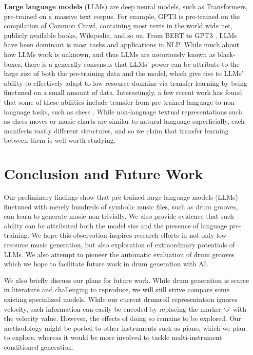 \documentclass[letterpaper]{article} %
\begin{document}
\textbf{Large language models} (LLMs) are deep neural models, such as Transformers, pre-trained on a massive text corpus. For example, GPT3 is pre-trained on the compilation of Common Crawl, containing most texts in the world wide net, publicly available books, Wikipedia, and so on. From BERT \cite{devlin-etal-2019-bert} to GPT3 \cite{NEURIPS2020_1457c0d6}, LLMs have been dominant is most tasks and applications in NLP. While much about how LLMs work is unknown, and thus LLMs are notoriously known as black-boxes, there is a generally consensus that LLMs' power can be attribute to the large size of both the pre-training data and the model, which give rise to LLMs' ability to effectively adapt to low-resource domains via transfer learning by being finetuned on a small amount of data. Interestingly, a few recent work has found that some of these abilities include transfer from pre-trained language to non-language tasks, such as chess \cite{stockl-2021-watching}. While non-language textual representations such as chess moves or music charts are similar to natural language superficially, each manifests vastly different structures, and so we claim that transfer learning between them is well worth studying.

\section{Conclusion and Future Work}
Our preliminary findings show that pre-trained large language models (LLMs) finetuned with merely hundreds of symbolic music files, such as drum grooves, can learn to generate music non-trivially. We also provide evidence that such ability can be attributed both the model size and the presence of language pre-training. We hope this observation inspires research efforts in not only low-resource music generation, but also exploration of extraordinary potentials of LLMs. We also attempt to pioneer the automatic evaluation of drum grooves which we hope to facilitate future work in drum generation with AI.

We also briefly discuss our plans for future work. While drum generation is scarce in literature and challenging to reproduce, we will still strive compare some existing specialized models. While our current drumroll representation ignores velocity, such information can easily be encoded by replacing the marker `o' with the velocity value. However, the effects of doing so remains to be explored. Our methodology might be ported to other instruments such as piano, which we plan to explore, whereas it would be more involved to tackle multi-instrument conditioned generation.
\end{document}
